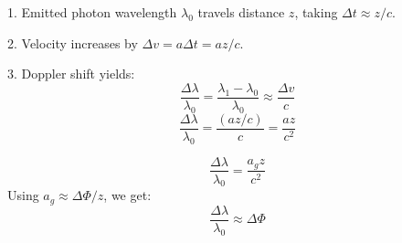 \documentclass[11pt, a4paper]{report}
\begin{document}
1. Emitted photon wavelength $\lambda_0$ travels distance $z$, taking $\Delta t \approx z/c$.


2. Velocity increases by $\Delta v = a \Delta t = az/c$.


3. Doppler shift yields:
\begin{equation} \frac{\Delta \lambda}{\lambda_0} = \frac{\lambda_1 - \lambda_0}{\lambda_0} \approx \frac{\Delta v}{c} \end{equation}
\begin{equation} \frac{\Delta \lambda}{\lambda_0} = \frac{(az/c)}{c} = \frac{az}{c^2} \end{equation}


\begin{equation} \frac{\Delta \lambda}{\lambda_0} = \frac{a_g z}{c^2} \end{equation}
Using $a_g \approx \Delta \Phi / z$, we get:
\begin{equation} \frac{\Delta \lambda}{\lambda_0} \approx \Delta \Phi \end{equation}
\end{document}
